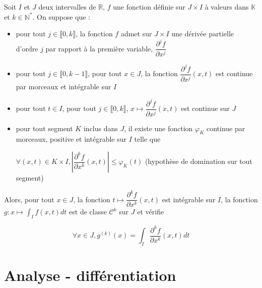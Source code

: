 \documentclass[a4paper,12pt]{book}
\newcommand{\Thr}[2]{\begin{tcolorbox}[sharp corners, colback=white,colframe=red!10!blue!30!green!75!, title=Théorème : #1]#2\end{tcolorbox}}
\def\R{\mathbb{R}}
\def\N{\mathbb{N}}
\def\K{\mathbb{K}}
\begin{document}
\Thr{Classe d'une intégrale à paramètre}{Soit $I$ et $J$ deux intervalles de $\R$, $f$ une fonction définie sur $J\times I$ à valeurs dans $\K$ et $k\in\N^*$. On suppose que :\begin{itemize}
\item pour tout $j\in\llbracket 0,k\rrbracket$, la fonction $f$ admet sur $J\times I$ une dérivée partielle d'ordre $j$ par rapport à la première variable, $\dfrac{\partial^j f}{\partial x^j}$
\item pour tout $j\in\llbracket 0,k-1\rrbracket$, pour tout $x\in J$, la fonction $\dfrac{\partial^j f}{\partial x^j}(x,t)$ est continue par morceaux et intégrable sur $I$
\item pour tout $t\in I$, pour tout $j\in\llbracket 0,k\rrbracket$, $x\mapsto \dfrac{\partial^j f}{\partial x^j}(x,t)$ est continue sur $J$
\item pour tout segment $K$ inclus dans $J$, il existe une fonction $\varphi_K$ continue par morceaux, positive et intégrable sur $I$ telle que
\par \begin{center}$\forall (x,t)\in K\times I, \left\vert\dfrac{\partial^k f}{\partial x^k}(x,t)\right\vert\leq \varphi_K(t)$ (hypothèse de domination sur tout segment)\end{center}
\end{itemize}
Alors, pour tout $x\in J$, la fonction $t\mapsto \dfrac{\partial^kf}{\partial x^k}(x,t)$ est intégrable sur $I$, la fonction $g:x\mapsto\int_If(x,t)dt$ est de classe $\mathcal{C}^k$ sur $J$ et vérifie
\par $$\forall x\in J, g^{(k)}(x)=\int_I\dfrac{\partial^k f}{\partial x^k}(x,t)dt$$}


\newpage
\section{Analyse - différentiation}
\end{document}
